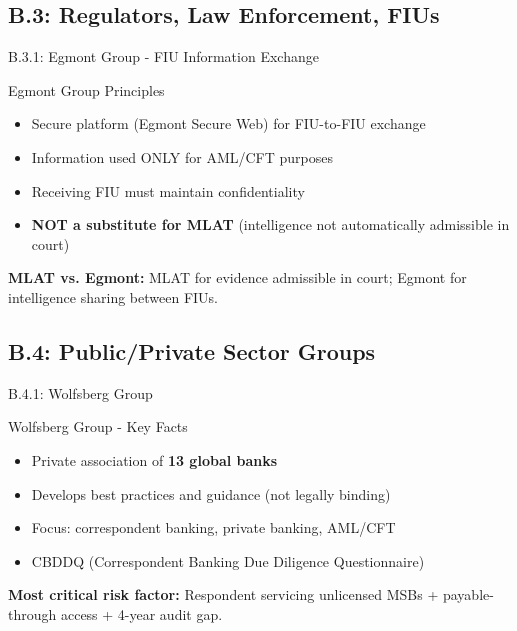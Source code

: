 \documentclass{beamer}
\begin{document}
	\subsection{B.3: Regulators, Law Enforcement, FIUs}
	
	\begin{frame}{B.3.1: Egmont Group - FIU Information Exchange}
		\begin{block}{Egmont Group Principles}
			\begin{itemize}
				\item Secure platform (Egmont Secure Web) for FIU-to-FIU exchange
				\item Information used ONLY for AML/CFT purposes
				\item Receiving FIU must maintain confidentiality
				\item \textbf{NOT a substitute for MLAT} (intelligence not automatically admissible in court)
			\end{itemize}
		\end{block}
		\textbf{MLAT vs. Egmont:} MLAT for evidence admissible in court; Egmont for intelligence sharing between FIUs.
	\end{frame}
	
	\subsection{B.4: Public/Private Sector Groups}
	
	\begin{frame}{B.4.1: Wolfsberg Group}
		\begin{block}{Wolfsberg Group - Key Facts}
			\begin{itemize}
				\item Private association of \textbf{13 global banks}
				\item Develops best practices and guidance (not legally binding)
				\item Focus: correspondent banking, private banking, AML/CFT
				\item CBDDQ (Correspondent Banking Due Diligence Questionnaire)
			\end{itemize}
		\end{block}
		\textbf{Most critical risk factor:} Respondent servicing unlicensed MSBs + payable-through access + 4-year audit gap.
	\end{frame}
	
\end{document}
